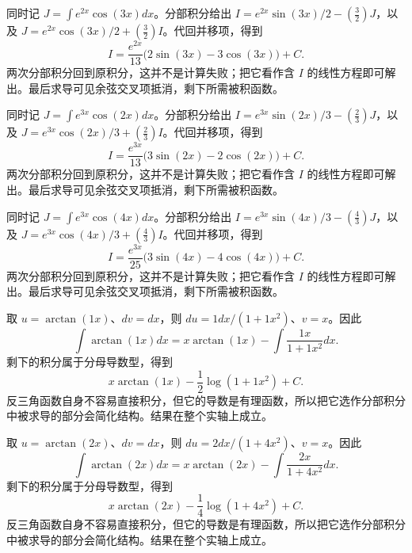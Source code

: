 \documentclass[UTF8,12pt,a4paper,fontset=fandol]{ctexart}
\begin{document}
\begin{solve}\label{ans:c15q4}
同时记 $J=\int e^{2x}\cos(3x)dx$。分部积分给出 $I=e^{2x}\sin(3x)/2-(\frac{3}{2})J$，以及 $J=e^{2x}\cos(3x)/2+(\frac{3}{2})I$。代回并移项，得到
\[
I=\frac{e^{2x}}{13}\bigl(2\sin(3x)-3\cos(3x)\bigr)+C.
\]
两次分部积分回到原积分，这并不是计算失败；把它看作含 $I$ 的线性方程即可解出。最后求导可见余弦交叉项抵消，剩下所需被积函数。
\end{solve}

\begin{solve}\label{ans:c15q5}
同时记 $J=\int e^{3x}\cos(2x)dx$。分部积分给出 $I=e^{3x}\sin(2x)/3-(\frac{2}{3})J$，以及 $J=e^{3x}\cos(2x)/3+(\frac{2}{3})I$。代回并移项，得到
\[
I=\frac{e^{3x}}{13}\bigl(3\sin(2x)-2\cos(2x)\bigr)+C.
\]
两次分部积分回到原积分，这并不是计算失败；把它看作含 $I$ 的线性方程即可解出。最后求导可见余弦交叉项抵消，剩下所需被积函数。
\end{solve}

\begin{solve}\label{ans:c15q6}
同时记 $J=\int e^{3x}\cos(4x)dx$。分部积分给出 $I=e^{3x}\sin(4x)/3-(\frac{4}{3})J$，以及 $J=e^{3x}\cos(4x)/3+(\frac{4}{3})I$。代回并移项，得到
\[
I=\frac{e^{3x}}{25}\bigl(3\sin(4x)-4\cos(4x)\bigr)+C.
\]
两次分部积分回到原积分，这并不是计算失败；把它看作含 $I$ 的线性方程即可解出。最后求导可见余弦交叉项抵消，剩下所需被积函数。
\end{solve}

\begin{solve}\label{ans:c15q7}
取 $u=\arctan(1x)$、$dv=dx$，则 $du=1dx/(1+1x^2)$、$v=x$。因此
\[
\int\arctan(1x)dx=x\arctan(1x)-\int\frac{1x}{1+1x^2}dx.
\]
剩下的积分属于分母导数型，得到
\[
x\arctan(1x)-\frac{1}{2}\log(1+1x^2)+C.
\]
反三角函数自身不容易直接积分，但它的导数是有理函数，所以把它选作分部积分中被求导的部分会简化结构。结果在整个实轴上成立。
\end{solve}

\begin{solve}\label{ans:c15q8}
取 $u=\arctan(2x)$、$dv=dx$，则 $du=2dx/(1+4x^2)$、$v=x$。因此
\[
\int\arctan(2x)dx=x\arctan(2x)-\int\frac{2x}{1+4x^2}dx.
\]
剩下的积分属于分母导数型，得到
\[
x\arctan(2x)-\frac{1}{4}\log(1+4x^2)+C.
\]
反三角函数自身不容易直接积分，但它的导数是有理函数，所以把它选作分部积分中被求导的部分会简化结构。结果在整个实轴上成立。
\end{solve}
\end{document}
